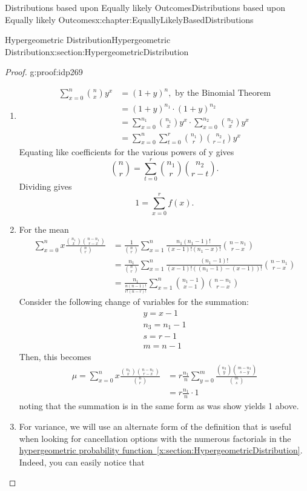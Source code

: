 \documentclass[oneside,10pt,]{book}
\newcommand{\xreffont}{\relax}
\numberwithin{equation}{section}
\begin{document}
\begin{chapterptx}{Distributions based upon Equally likely Outcomes}{}{Distributions based upon Equally likely Outcomes}{}{}{x:chapter:EquallyLikelyBasedDistributions}
\begin{sectionptx}{Hypergeometric Distribution}{}{Hypergeometric Distribution}{}{}{x:section:HypergeometricDistribution}
\begin{proof}{}{g:proof:idp269}
%
\begin{enumerate}
\item{}%
\begin{align*}
\sum_{x=0}^n \binom{n}{x} y^x & = (1+y)^n, \text{ by the Binomial Theorem}\\
& = (1+y)^{n_1} \cdot (1+y)^{n_2} \\
& = \sum_{x=0}^{n_1} \binom{n_1}{x} y^x \cdot \sum_{x=0}^{n_2} \binom{n_2}{x} y^x \\
& = \sum_{x=0}^n \sum_{t=0}^r \binom{n_1}{r} \binom{n_2}{r-t} y^x
\end{align*}
Equating like coefficients for the various powers of y gives%
\begin{equation*}
\binom{n}{r} = \sum_{t=0}^r \binom{n_1}{r} \binom{n_2}{r-t}.
\end{equation*}
Dividing gives%
\begin{equation*}
1 = \sum_{x=0}^r f(x).
\end{equation*}
%
\item{}For the mean%
\begin{align*}
\sum_{x=0}^n x \frac{\binom{n_1}{x} \binom{n-n_1}{r-x}}{\binom{n}{r}} & = 
\frac{1}{\binom{n}{r}} \sum_{x=1}^n  \frac{n_1(n_1-1)!}{(x-1)!(n_1-x)!}  \binom{n-n_1}{r-x}\\
& = \frac{n_1}{\binom{n}{r}} \sum_{x=1}^n  \frac{(n_1-1)!}{(x-1)!((n_1-1)-(x-1))!}  \binom{n-n_1}{r-x} \\
& = \frac{n_1}{\frac{n(n-1)!}{r!(n-r)!}} \sum_{x=1}^n  \binom{n_1-1}{x-1}  \binom{n-n_1}{r-x} 
\end{align*}
Consider the following change of variables for the summation:%
\begin{gather*}
y = x-1\\
n_3 = n_1-1\\
s = r-1\\
m = n-1
\end{gather*}
Then, this becomes%
\begin{align*}
\mu = \sum_{x=0}^n x \frac{\binom{n_1}{x} \binom{n-n_1}{r-x}}{\binom{n}{r}} & = r \frac{n_1}{n} \sum_{y=0}^m  \frac{\binom{n_3}{y} \binom{m-n_3}{s-y}}{\binom{m}{s}}\\
& = r \frac{n_1}{n} \cdot 1
\end{align*}
noting that the summation is in the same form as was show yields 1 above.%
\item{}For variance, we will use an alternate form of the definition that is useful when looking for cancellation options with the numerous factorials in the \hyperref[x:section:HypergeometricDistribution]{hypergeometric probability function~{\xreffont\ref{x:section:HypergeometricDistribution}}}.  Indeed, you can easily notice that%

\end{enumerate}
\end{proof}
\end{sectionptx}
\end{chapterptx}
\end{document}
